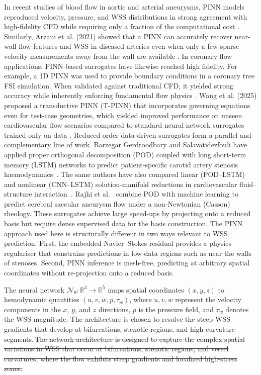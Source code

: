 ﻿\documentclass[12pt,a4paper]{article}
\newcommand{\added}[2][]{\begingroup\color{red}#2\endgroup}
\newcommand{\deleted}[2][]{\begingroup\color{red}\sout{#2}\endgroup}
\newcommand{\replaced}[3][]{\added{#2}\,\deleted{#3}}
\newcommand{\addp}[1]{\added{#1}}
\theoremstyle{definition}
\numberwithin{equation}{section}
\begin{document}
{{In recent studies of blood flow in aortic and arterial aneurysms, PINN models reproduced velocity, pressure, and WSS distributions in strong agreement with high-fidelity CFD while requiring only a fraction of the computational cost \cite{92, 94}. Similarly, Arzani et al. (2021) showed that a PINN can accurately recover near-wall flow features and WSS in diseased arteries even when only a few sparse velocity measurements away from the wall are available \cite{93}. In coronary flow applications, PINN-based surrogates have likewise reached high fidelity. For example, a 1D PINN was used to provide boundary conditions in a coronary tree FSI simulation. When validated against traditional CFD, it yielded strong accuracy while inherently enforcing fundamental flow physics \cite{95}. Wang et al. (2025) proposed a transductive PINN (T-PINN) that incorporates governing equations even for test-case geometries, which yielded improved performance on unseen cardiovascular flow scenarios compared to standard neural network surrogates trained only on data \cite{97}. \addp{Reduced-order data-driven surrogates form a parallel and complementary line of work. Barzegar Gerdroodbary and Salavatidezfouli have applied proper orthogonal decomposition (POD) coupled with long short-term memory (LSTM) networks to predict patient-specific carotid artery stenosis haemodynamics~\cite{108}. The same authors have also compared linear (POD--LSTM) and nonlinear (CNN--LSTM) solution-manifold reductions in cardiovascular fluid--structure interaction~\cite{109}. Rajhi et al.~\cite{110} combine POD with machine learning to predict cerebral saccular aneurysm flow under a non-Newtonian (Casson) rheology. These surrogates achieve large speed-ups by projecting onto a reduced basis but require dense supervised data for the basis construction. The PINN approach used here is structurally different in two ways relevant to WSS prediction. First, the embedded Navier--Stokes residual provides a physics regulariser that constrains predictions in low-data regions such as near the walls of stenoses. Second, PINN inference is mesh-free, predicting at arbitrary spatial coordinates without re-projection onto a reduced basis.}}   

The neural network $\mathcal{N}_\theta: \mathbb{R}^3 \rightarrow \mathbb{R}^5$ maps spatial coordinates $(x, y, z)$ to hemodynamic quantities $(u, v, w, p, \tau_w)$, where $u, v, w$ represent the velocity components in the $x$, $y$, and $z$ directions, $p$ is the pressure field, and $\tau_w$ denotes the WSS magnitude. \replaced[id=pinn]{The architecture is chosen to resolve the steep WSS gradients that develop at bifurcations, stenotic regions, and high-curvature segments.}{The network architecture is designed to capture the complex spatial variations in WSS that occur at bifurcations, stenotic regions, and vessel curvatures, where the flow exhibits steep gradients and localized high-stress zones.}

}
\end{document}
